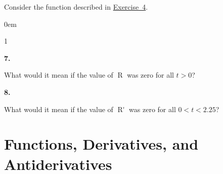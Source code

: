 \documentclass[12pt,]{book}
\newcommand{\lt}{<}
\newcommand{\gt}{>}
\theoremstyle{plain}
\theoremstyle{definition}
\numberwithin{equation}{section}
\newenvironment{exercisegroup}%
{\medskip\noindent}%
{\par\bigskip}%
\newlength{\exercisegroupindent}%
\newlength{\exercisegroupitemwidth}%
\newenvironment{exercisegrouplist}%
{\vspace{-\partopsep}%
\begin{adjustwidth}{\exercisegroupindent}{0em}}%
{\end{adjustwidth}%
\vspace{-\partopsep}%
\vspace{\baselineskip}}%
\newenvironment{exercisegroupbycol}[1]%
{\begin{exercisegrouplist}%
\vspace{-\multicolsep}%
\begin{multicols}{#1}%
\setlength{\parindent}{0em}%
\setlength{\exercisegroupitemwidth}{\linewidth}}%
{\end{multicols}%
\vspace{-\multicolsep}%
\end{exercisegrouplist}}%
\newenvironment{exercisegroupitem}[1]%
{\begin{minipage}[t]{\exercisegroupitemwidth}
\vspace{0pt}%
{\bfseries#1}%
\rule{0pt}{\baselineskip}}{\strut%
\end{minipage}%
\hspace{\columnsep}}%
\providecommand\phantomsection{}
\newcommand{\fe}[2]{\mathop{{#1}{\left(#2\right)}}}
\newcommand{\fd}[1]{#1'}
\begin{document}
\begin{exercisegroup}%
Consider the function described in \hyperref[exercise-bathtub-rate]{Exercise~4}.%
\par
\begin{exercisegroupbycol}{1}%
\begin{exercisegroupitem}{7. }\phantomsection\hypertarget{exercise-200}{\null}
What would it mean if the value of \(\fe{R}{t}\) was zero for all \(t\gt0\)?%
\end{exercisegroupitem}%
\par%
\begin{exercisegroupitem}{8. }\phantomsection\hypertarget{exercise-201}{\null}
What would it mean if the value of \(\fe{\fd{R}}{t}\) was zero for all \(0\lt t\lt2.25\)?%
\end{exercisegroupitem}%
\par%
\end{exercisegroupbycol}%
\end{exercisegroup}%
\typeout{************************************************}
\typeout{************************************************}
\chapter[Functions, Derivatives, and Antiderivatives]{Functions, Derivatives, and Antiderivatives}\label{chapter-functions-derivatives-antiderivatives}
\typeout{************************************************}
\typeout{************************************************}
\end{document}
